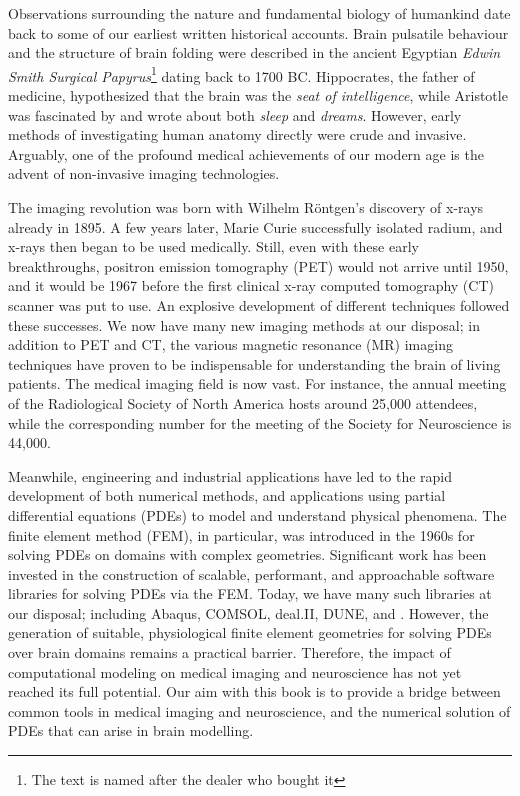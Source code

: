%
%

\preface

Observations surrounding the nature and fundamental biology of
humankind date back to some of our earliest written historical
accounts.  Brain pulsatile behaviour and the structure of brain
folding were described in the ancient Egyptian \textit{Edwin Smith
Surgical Papyrus}\footnote{The text is named after the dealer who
bought it} dating back to 1700 BC.  Hippocrates, the father of
medicine, hypothesized that the brain was the \textit{seat of
intelligence}, while Aristotle was fascinated by and wrote about
both \textit{sleep} and \textit{dreams}. However, early methods of
investigating human anatomy directly were crude and invasive.
Arguably, one of the profound medical achievements of our modern age
is the advent of non-invasive imaging technologies.

The imaging revolution was born with Wilhelm R{\"o}ntgen's discovery of
x-rays already in 1895. A few years later, Marie Curie successfully
isolated radium, and x-rays then began to be used medically. Still,
even with these early breakthroughs, positron emission tomography
(PET) would not arrive until 1950, and it would be 1967 before the
first clinical x-ray computed tomography (CT) scanner was put to use.
An explosive development of different techniques followed these
successes.  We now have many new imaging methods at our disposal; in
addition to PET and CT, the various magnetic resonance (MR) imaging
techniques have proven to be indispensable for understanding the brain
of living patients. The medical imaging field is now vast. For
instance, the annual meeting of the Radiological Society of North
America hosts around 25,000 attendees, while the corresponding number
for the meeting of the Society for Neuroscience is 44,000.

Meanwhile, engineering and industrial applications have led to the
rapid development of both numerical methods, and applications using
partial differential equations (PDEs) to model and understand physical
phenomena. The finite element method (FEM), in particular, was
introduced in the 1960s for solving PDEs on domains with complex
geometries. Significant work has been invested in the construction of
scalable, performant, and approachable software libraries for solving
PDEs via the FEM. Today, we have many such libraries at our disposal;
including Abaqus, COMSOL, deal.II, DUNE, and {\fenics}. However, the
generation of suitable, physiological finite element geometries for
solving PDEs over brain domains remains a practical
barrier. Therefore, the impact of computational modeling on medical
imaging and neuroscience has not yet reached its full potential. Our
aim with this book is to provide a bridge between common tools in
medical imaging and neuroscience, and the numerical solution of PDEs
that can arise in brain modelling.


